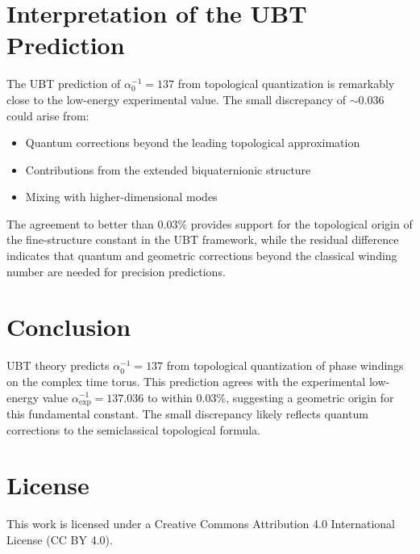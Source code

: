 \documentclass[12pt, a4paper]{article}
\begin{document}
\section{Interpretation of the UBT Prediction}

The UBT prediction of $\alpha_0^{-1} = 137$ from topological quantization is remarkably close to the low-energy experimental value. The small discrepancy of $\sim 0.036$ could arise from:
\begin{itemize}
\item Quantum corrections beyond the leading topological approximation
\item Contributions from the extended biquaternionic structure
\item Mixing with higher-dimensional modes
\end{itemize}

The agreement to better than $0.03\%$ provides support for the topological origin of the fine-structure constant in the UBT framework, while the residual difference indicates that quantum and geometric corrections beyond the classical winding number are needed for precision predictions.

\section{Conclusion}

UBT theory predicts $\alpha_0^{-1} = 137$ from topological quantization of phase windings on the complex time torus. This prediction agrees with the experimental low-energy value $\alpha_{\text{exp}}^{-1} = 137.036$ to within $0.03\%$, suggesting a geometric origin for this fundamental constant. The small discrepancy likely reflects quantum corrections to the semiclassical topological formula.


\section*{License}
This work is licensed under a Creative Commons Attribution 4.0 International License (CC BY 4.0).
\end{document}
